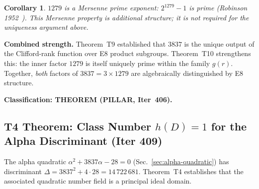 \documentclass[aps,prd,twocolumn,superscriptaddress,floatfix,nofootinbib]{revtex4-2}
\newtheorem{corollary}[theorem]{Corollary}
\theoremstyle{definition}
\theoremstyle{remark}
\begin{document}
\begin{corollary}
$1279$ is a Mersenne prime exponent: $2^{1279}-1$ is prime (Robinson
1952~\cite{robinson1952}).  This Mersenne property is additional structure; it is not
required for the uniqueness argument above.
\end{corollary}

\textbf{Combined strength.}  Theorem~T9 established that $3837$ is the unique
output of the Clifford-rank function over E8 product subgroups.  Theorem~T10
strengthens this: the inner factor $1279$ is itself uniquely prime within the
family $g(r)$.  Together, \emph{both} factors of $3837 = 3 \times 1279$ are
algebraically distinguished by E8 structure.

\textbf{Classification: THEOREM (PILLAR, Iter~406).}

\subsection{T4 Theorem: Class Number $h(D) = 1$ for the Alpha Discriminant (Iter 409)}
\label{sec:class-number-alpha}

The alpha quadratic $\alpha^2 + 3837\alpha - 28 = 0$ (Sec.~\ref{sec:alpha-quadratic})
has discriminant $\Delta = 3837^2 + 4\cdot28 = 14\,722\,681$.  Theorem~T4
establishes that the associated quadratic number field is a principal ideal domain.
\end{document}
